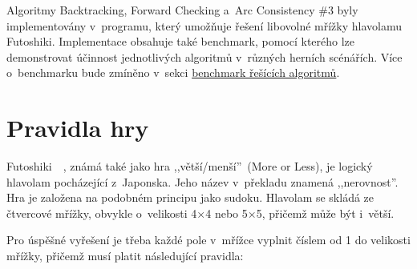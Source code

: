 Algoritmy Backtracking, Forward Checking a~Arc Consistency \#3 byly
implementovány v~programu, který umožňuje řešení libovolné mřížky hlavolamu
Futoshiki. Implementace obsahuje také benchmark, pomocí kterého lze
demonstrovat účinnost jednotlivých algoritmů v~různých herních scénářích. Více
o~benchmarku bude zmíněno v~sekci
\hyperref[sec:timeComplexity]{benchmark řešících algoritmů}.

\section{Pravidla hry}

Futoshiki~\cite{FutoshikiBook1}~\cite{FutoshikiBook2}, známá také jako hra
,,větší/menší''\ (More or Less), je logický hlavolam pocházející z~Japonska.
Jeho název v~překladu znamená ,,nerovnost''. Hra je založena na podobném
principu jako sudoku. Hlavolam se skládá ze čtvercové mřížky, obvykle
o~velikosti 4×4 nebo 5×5, přičemž může být i~větší.

Pro úspěšné vyřešení je třeba každé pole v~mřížce vyplnit číslem od 1 do
velikosti mřížky, přičemž musí platit následující pravidla:

